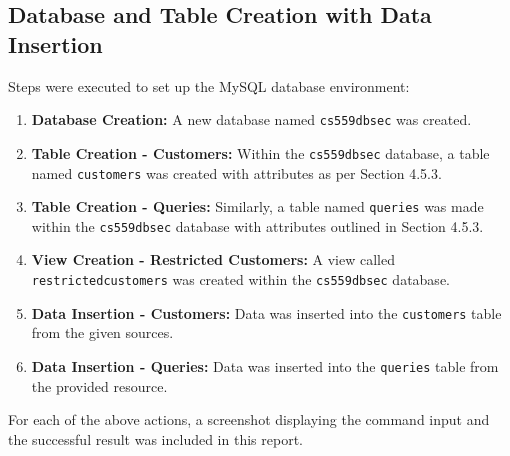 \documentclass{article}
\begin{document}
%

\subsection*{Database and Table Creation with Data Insertion}

Steps were executed to set up the MySQL database environment:

\begin{enumerate}
    \item \textbf{Database Creation:} A new database named \texttt{cs559dbsec} was created.
    
    \item \textbf{Table Creation - Customers:} Within the \texttt{cs559dbsec} database, a table named \texttt{customers} was created with attributes as per Section 4.5.3.
    
    \item \textbf{Table Creation - Queries:} Similarly, a table named \texttt{queries} was made within the \texttt{cs559dbsec} database with attributes outlined in Section 4.5.3.
    
    \item \textbf{View Creation - Restricted Customers:} A view called \texttt{restrictedcustomers} was created within the \texttt{cs559dbsec} database.
    
    \item \textbf{Data Insertion - Customers:} Data was inserted into the \texttt{customers} table from the given sources.
    
    \item \textbf{Data Insertion - Queries:} Data was inserted into the \texttt{queries} table from the provided resource.
\end{enumerate}

For each of the above actions, a screenshot displaying the command input and the successful result was included in this report. 
\end{document}

